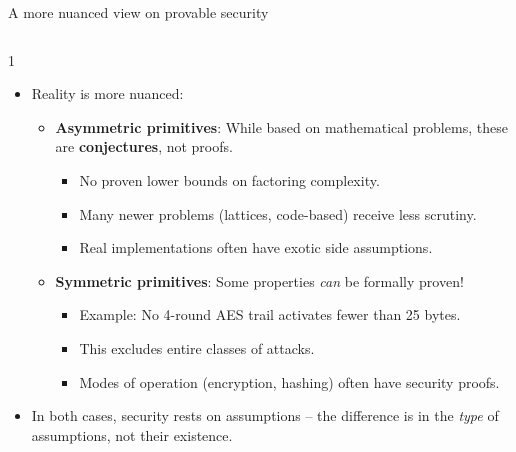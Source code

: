 \ifdefined\PRESENTATION\else\PassOptionsToClass{handout}{beamer}\fi\documentclass[aspectratio=169, lualatex]{beamer}
\begin{document}
\begin{frame}{A more nuanced view on provable security}
	\begin{columns}[c]
		\begin{column}{1\textwidth}
			\begin{itemize}[<+->]
				\item Reality is more nuanced:
				      \begin{itemize}
					      \item \textbf{Asymmetric primitives}: While based on mathematical problems, these are \textbf{conjectures}, not proofs.
					            \begin{itemize}
						            \item No proven lower bounds on factoring complexity.
						            \item Many newer problems (lattices, code-based) receive less scrutiny.
						            \item Real implementations often have exotic side assumptions.
					            \end{itemize}
					      \item \textbf{Symmetric primitives}: Some properties \textit{can} be formally proven!
					            \begin{itemize}
						            \item Example: No 4-round AES trail activates fewer than 25 bytes.
						            \item This excludes entire classes of attacks.
						            \item Modes of operation (encryption, hashing) often have security proofs.
					            \end{itemize}
				      \end{itemize}
				\item In both cases, security rests on assumptions -- the difference is in the \textit{type} of assumptions, not their existence.
			\end{itemize}
		\end{column}
	\end{columns}
\end{frame}
\end{document}
